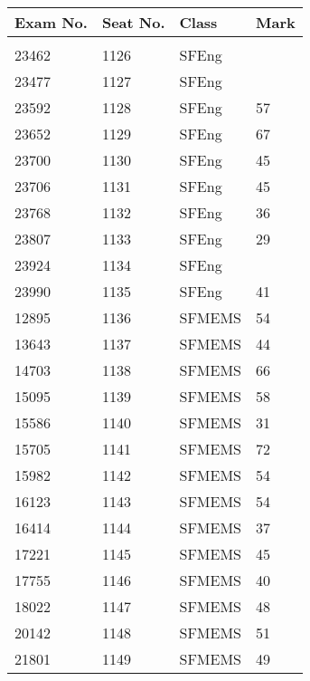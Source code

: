 \documentclass[a4paper]{article}
\begin{document}
\begin{tabular}{llll}
Exam No.&Seat No.&Class&Mark\\[3pt]
 \hline\\[3pt]
23462&1126&SFEng&\\
23477&1127&SFEng&\\
23592&1128&SFEng&57\\
23652&1129&SFEng&67\\
23700&1130&SFEng&45\\
23706&1131&SFEng&45\\
23768&1132&SFEng&36\\
23807&1133&SFEng&29\\
23924&1134&SFEng&\\
23990&1135&SFEng&41\\
12895&1136&SFMEMS&54\\
13643&1137&SFMEMS&44\\
14703&1138&SFMEMS&66\\
15095&1139&SFMEMS&58\\
15586&1140&SFMEMS&31\\
15705&1141&SFMEMS&72\\
15982&1142&SFMEMS&54\\
16123&1143&SFMEMS&54\\
16414&1144&SFMEMS&37\\
17221&1145&SFMEMS&45\\
17755&1146&SFMEMS&40\\
18022&1147&SFMEMS&48\\
20142&1148&SFMEMS&51\\
21801&1149&SFMEMS&49\\
\end{tabular}
\end{document}
